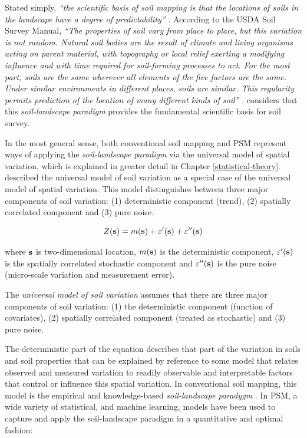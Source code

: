 \documentclass[graybox,natbib,nospthms,UStrade]{svmono}
\let\BeginKnitrBlock\begin \let\EndKnitrBlock\end
\let\BeginKnitrBlock\begin \let\EndKnitrBlock\end
\begin{document}
Stated simply, \emph{``the scientific basis of soil mapping is that the
locations of soils in the landscape have a degree of predictability''}
\citep{Miller1979}. According to the USDA Soil Survey Manual, \emph{``The
properties of soil vary from place to place, but this variation is not
random. Natural soil bodies are the result of climate and living
organisms acting on parent material, with topography or local relief
exerting a modifying influence and with time required for soil-forming
processes to act. For the most part, soils are the same wherever all
elements of the five factors are the same. Under similar environments in
different places, soils are similar. This regularity permits prediction
of the location of many different kinds of soil''} \citep{SSDS1993}.
\citet{Hudson2000SSSAJ} considers that this \emph{soil-landscape paradigm} provides
the fundamental scientific basis for soil survey.

In the most general sense, both conventional soil mapping and PSM
represent ways of applying the \emph{soil-landscape paradigm} via the universal model of spatial
variation, which is explained in greater detail in
Chapter \ref{statistical-theory}. \citet[p.133]{Burrough1998OUP} described the
universal model of soil variation as a special case of the universal
model of spatial variation. This model distinguishes between three major
components of soil variation: (1) deterministic component (trend), (2)
spatially correlated component and (3) pure noise.

\begin{equation}
Z({\bf{s}}) = m({\bf{s}}) + \varepsilon '({\bf{s}}) + \varepsilon ''({\bf{s}})
\label{eq:univ-var}
\end{equation}

where \(\bf{s}\) is two-dimensional location, \(m({\bf{s}})\) is the
deterministic component, \(\varepsilon '({\bf{s}})\) is the spatially
correlated stochastic component and \(\varepsilon ''({\bf{s}})\) is the
pure noise (micro-scale variation and measurement error).

\BeginKnitrBlock{rmdnote}
The \emph{universal model of soil variation} assumes that
there are three major components of soil variation: (1) the
deterministic component (function of covariates), (2) spatially
correlated component (treated as stochastic) and (3) pure noise.
\EndKnitrBlock{rmdnote}

The deterministic part of the equation describes that part of the
variation in soils and soil properties that can be explained by
reference to some model that relates observed and measured variation to
readily observable and interpretable factors that control or influence
this spatial variation. In conventional soil mapping, this model is the
empirical and knowledge-based \emph{soil-landscape paradygm}
\citep{Hudson2000SSSAJ}. In PSM, a wide variety of statistical, and machine learning,
models have been used to capture and apply the soil-landscape paradigm
in a quantitative and optimal fashion:
\end{document}
